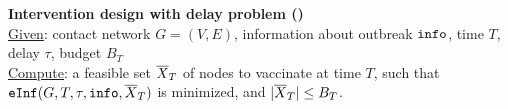 \noindent
\textbf{Intervention design with delay problem (\probdelay)}\\
\underline{Given}: contact network $G=(V, E)$, information about outbreak $\texttt{info}$, time $T$, delay $\tau$,
budget $B_T$\\
\underline{Compute}: a feasible set $\overline{X}_T$ of nodes to vaccinate at time $T$,
such that $\texttt{eInf}(G, T, \tau, \texttt{info}, \overline{X}_T)$ is minimized, and $|\overline{X}_T|\leq B_T$.

